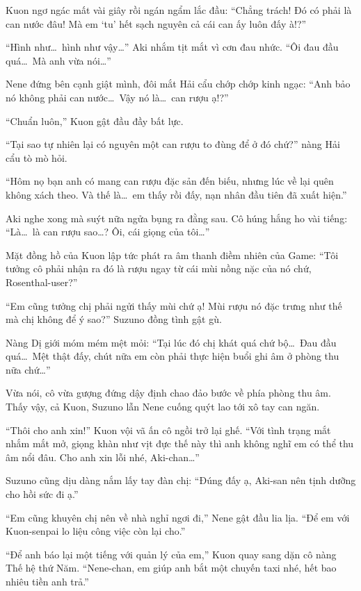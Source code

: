 \documentclass[../main.tex]{subfiles}
\begin{document}
Kuon ngơ ngác mất vài giây rồi ngán ngẩm lắc đầu: ``Chẳng trách! Đó có phải là can nước đâu! Mà em `tu' hết sạch nguyên cả cái can ấy luôn đấy à!?''

``Hình như\dots\ hình như vậy\dots'' Aki nhắm tịt mắt vì cơn đau nhức. ``Ôi đau đầu quá\dots\ Mà anh vừa nói\dots''

Nene đứng bên cạnh giật mình, đôi mắt Hải cẩu chớp chớp kinh ngạc: ``Anh bảo nó không phải can nước\dots\ Vậy nó là\dots\ can rượu ạ!?''

``Chuẩn luôn,'' Kuon gật đầu đầy bất lực.

``Tại sao tự nhiên lại có nguyên một can rượu to đùng để ở đó chứ?'' nàng Hải cẩu tò mò hỏi.

``Hôm nọ bạn anh có mang can rượu đặc sản đến biếu, nhưng lúc về lại quên không xách theo. Và thế là\dots\ em thấy rồi đấy, nạn nhân đầu tiên đã xuất hiện.''

Aki nghe xong mà suýt nữa ngửa bụng ra đằng sau. Cô húng hắng ho vài tiếng: ``Là\dots\ là can rượu sao\dots? Ôi, cái giọng của tôi\dots''

Mặt đồng hồ của Kuon lập tức phát ra âm thanh điềm nhiên của Game: ``Tôi tưởng cô phải nhận ra đó là rượu ngay từ cái mùi nồng nặc của nó chứ, Rosenthal-user?''

``Em cũng tưởng chị phải ngửi thấy mùi chứ ạ! Mùi rượu nó đặc trưng như thế mà chị không để ý sao?'' Suzuno đồng tình gật gù.

Nàng Dị giới móm mém mệt mỏi: ``Tại lúc đó chị khát quá chứ bộ\dots\ Đau đầu quá\dots\ Mệt thật đấy, chút nữa em còn phải thực hiện buổi ghi âm ở phòng thu nữa chứ\dots''

Vừa nói, cô vừa gượng đứng dậy định chao đảo bước về phía phòng thu âm. Thấy vậy, cả Kuon, Suzuno lẫn Nene cuống quýt lao tới xô tay can ngăn.

``Thôi cho anh xin!'' Kuon vội vã ấn cô ngồi trở lại ghế. ``Với tình trạng mắt nhắm mắt mở, giọng khàn như vịt đực thế này thì anh không nghĩ em có thể thu âm nổi đâu. Cho anh xin lỗi nhé, Aki-chan\dots''

Suzuno cũng dịu dàng nắm lấy tay đàn chị: ``Đúng đấy ạ, Aki-san nên tịnh dưỡng cho hồi sức đi ạ.''

``Em cũng khuyên chị nên về nhà nghỉ ngơi đi,'' Nene gật đầu lia lịa. ``Để em với Kuon-senpai lo liệu công việc còn lại cho.''

``Để anh báo lại một tiếng với quản lý của em,'' Kuon quay sang dặn cô nàng Thế hệ thứ Năm. ``Nene-chan, em giúp anh bắt một chuyến taxi nhé, hết bao nhiêu tiền anh trả.''
\end{document}
